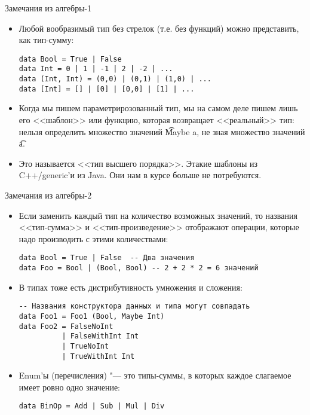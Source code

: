\begin{frame}[fragile]{Замечания из алгебры-1}
	\begin{itemize}
		\item Любой вообразимый тип без стрелок (т.е. без функций) можно представить, как тип-сумму:
\begin{verbatim}
data Bool = True | False
data Int = 0 | 1 | -1 | 2 | -2 | ...
data (Int, Int) = (0,0) | (0,1) | (1,0) | ...
data [Int] = [] | [0] | [0,0] | [1] | ...
\end{verbatim}
		\item Когда мы пишем параметрирозованный тип, мы на самом деле пишем лишь его <<шаблон>> или функцию, которая возвращает <<реальный>> тип:
			нельзя определить множество значений \t{Maybe a}, не зная множество значений \t{a}.
		\item
			Это называется <<тип высшего порядка>>.
			Этакие шаблоны из C++/generic'и из Java.
			Они нам в курсе больше не потребуются.
	\end{itemize}
\end{frame}

\begin{frame}[fragile]{Замечания из алгебры-2}
	\begin{itemize}
		\item
			Если заменить каждый тип на количество возможных значений, то названия <<тип-сумма>> и <<тип-произведение>> отображают
			операции, которые надо производить с этими количествами:
\begin{verbatim}
data Bool = True | False  -- Два значения
data Foo = Bool | (Bool, Bool) -- 2 + 2 * 2 = 6 значений
\end{verbatim}
		\item
			В типах тоже есть дистрибутивность умножения и сложения:
\begin{verbatim}
-- Названия конструктора данных и типа могут совпадать
data Foo1 = Foo1 (Bool, Maybe Int)
data Foo2 = FalseNoInt
          | FalseWithInt Int
          | TrueNoInt
          | TrueWithInt Int
\end{verbatim}
		\item Enum'ы (перечисления) "--- это типы-суммы, в которых каждое слагаемое имеет ровно одно значение:
\begin{verbatim}
data BinOp = Add | Sub | Mul | Div
\end{verbatim}
	\end{itemize}
\end{frame}
